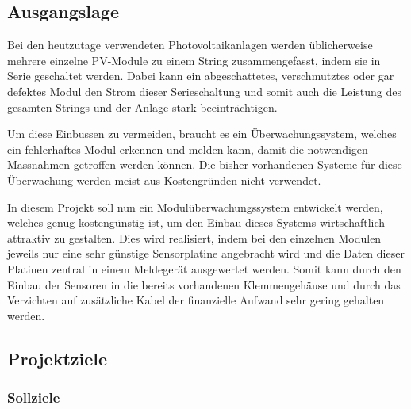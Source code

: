\subsection{Ausgangslage}

Bei  den  heutzutage  verwendeten Photovoltaikanlagen  werden  \"ublicherweise
mehrere einzelne PV-Module zu einem String zusammengefasst, indem sie in Serie
geschaltet  werden. Dabei  kann  ein abgeschattetes,  verschmutztes  oder  gar
defektes Modul den Strom dieser Serieschaltung und somit auch die Leistung des
gesamten Strings und der Anlage stark beeintr\"achtigen.

Um  diese Einbussen  zu vermeiden,  braucht es  ein \"Uberwachungssystem,
welches ein  fehlerhaftes  Modul erkennen und  melden kann,  damit die
notwendigen  Massnahmen  getroffen  werden  k\"onnen. Die  bisher  vorhandenen
Systeme  f\"ur  diese \"Uberwachung  werden  meist  aus Kostengr\"unden  nicht
verwendet.

In diesem  Projekt soll  nun ein Modul\"uberwachungssystem  entwickelt werden,
welches genug kosteng\"unstig ist, um den Einbau dieses Systems wirtschaftlich
attraktiv zu gestalten. Dies wird realisiert,  indem bei den einzelnen Modulen
jeweils nur eine  sehr g\"unstige Sensorplatine angebracht wird  und die Daten
dieser Platinen  zentral in einem Meldeger\"at  ausgewertet werden. Somit kann
durch den Einbau der Sensoren  in die bereits vorhandenen Klemmengeh\"ause und
durch  das Verzichten  auf zus\"atzliche  Kabel der  finanzielle Aufwand  sehr
gering gehalten werden.


\subsection{Projektziele}

\subsubsection{Sollziele}


